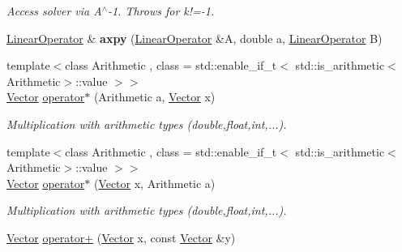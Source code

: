 \begin{DoxyCompactItemize}
\begin{DoxyCompactList}\small\item\em Access solver via A$^\wedge$-\/1. Throws for k!=-\/1. \end{DoxyCompactList}\item 
\hypertarget{namespaceSpacy_ad08055ec05275c6042d516d4726b5e8f}{\hyperlink{classSpacy_1_1LinearOperator}{Linear\-Operator} \& {\bfseries axpy} (\hyperlink{classSpacy_1_1LinearOperator}{Linear\-Operator} \&A, double a, \hyperlink{classSpacy_1_1LinearOperator}{Linear\-Operator} B)}\label{namespaceSpacy_ad08055ec05275c6042d516d4726b5e8f}

\item 
\hypertarget{namespaceSpacy_ae0a1cbb3d98d6ac0a82727959038f4b4}{{\footnotesize template$<$class Arithmetic , class  = std\-::enable\-\_\-if\-\_\-t$<$ std\-::is\-\_\-arithmetic$<$\-Arithmetic$>$\-::value $>$$>$ }\\\hyperlink{classSpacy_1_1Vector}{Vector} \hyperlink{namespaceSpacy_ae0a1cbb3d98d6ac0a82727959038f4b4}{operator$\ast$} (Arithmetic a, \hyperlink{classSpacy_1_1Vector}{Vector} x)}\label{namespaceSpacy_ae0a1cbb3d98d6ac0a82727959038f4b4}

\begin{DoxyCompactList}\small\item\em Multiplication with arithmetic types (double,float,int,...). \end{DoxyCompactList}\item 
\hypertarget{namespaceSpacy_a0120fd6b1d7580a9f7b8f24e646cbc6c}{{\footnotesize template$<$class Arithmetic , class  = std\-::enable\-\_\-if\-\_\-t$<$ std\-::is\-\_\-arithmetic$<$\-Arithmetic$>$\-::value $>$$>$ }\\\hyperlink{classSpacy_1_1Vector}{Vector} \hyperlink{namespaceSpacy_a0120fd6b1d7580a9f7b8f24e646cbc6c}{operator$\ast$} (\hyperlink{classSpacy_1_1Vector}{Vector} x, Arithmetic a)}\label{namespaceSpacy_a0120fd6b1d7580a9f7b8f24e646cbc6c}

\begin{DoxyCompactList}\small\item\em Multiplication with arithmetic types (double,float,int,...). \end{DoxyCompactList}\item 
\hypertarget{namespaceSpacy_a19486acb05af1627ec49c376b204a61c}{\hyperlink{classSpacy_1_1Vector}{Vector} \hyperlink{namespaceSpacy_a19486acb05af1627ec49c376b204a61c}{operator+} (\hyperlink{classSpacy_1_1Vector}{Vector} x, const \hyperlink{classSpacy_1_1Vector}{Vector} \&y)}\label{namespaceSpacy_a19486acb05af1627ec49c376b204a61c}


\end{DoxyCompactItemize}
